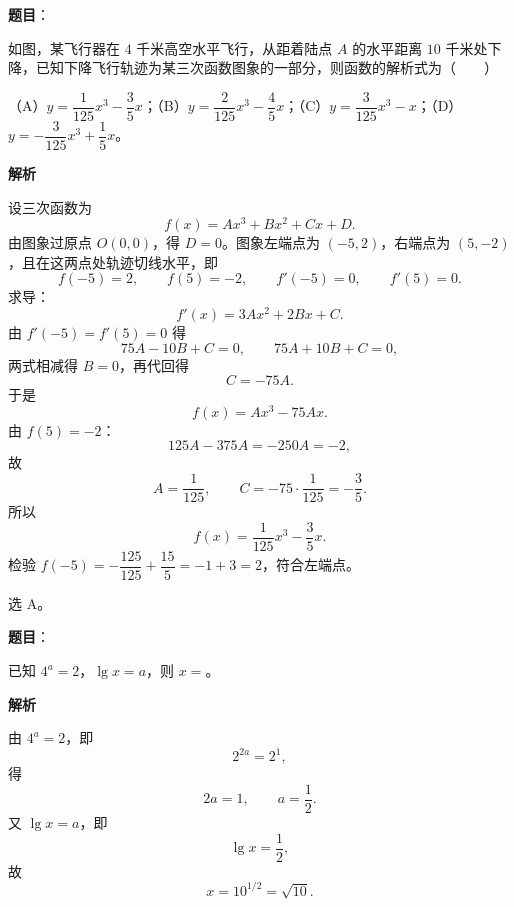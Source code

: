 \begin{answer}

\textbf{题目}：

如图，某飞行器在 $4$ 千米高空水平飞行，从距着陆点 $A$ 的水平距离 $10$ 千米处下降，已知下降飞行轨迹为某三次函数图象的一部分，则函数的解析式为\mbox{（　　）}
\nopagebreak[4]
\begin{center}\end{center}
\nopagebreak[4]
（A）$y=\dfrac{1}{125}x^3-\dfrac35x$；（B）$y=\dfrac{2}{125}x^3-\dfrac45x$；（C）$y=\dfrac{3}{125}x^3-x$；（D）$y=-\dfrac{3}{125}x^3+\dfrac15x$。

\textbf{解析}

设三次函数为
\nopagebreak[4]
\[f(x)=Ax^3+Bx^2+Cx+D.\]
由图象过原点 $O(0,0)$，得 $D=0$。图象左端点为 $(-5,2)$，右端点为 $(5,-2)$，且在这两点处轨迹切线水平，即
\nopagebreak[4]
\[f(-5)=2,\qquad f(5)=-2,\qquad f'(-5)=0,\qquad f'(5)=0.\]
求导：
\nopagebreak[4]
\[f'(x)=3Ax^2+2Bx+C.\]
由 $f'(-5)=f'(5)=0$ 得
\nopagebreak[4]
\[75A-10B+C=0,\qquad 75A+10B+C=0,\]
两式相减得 $B=0$，再代回得
\nopagebreak[4]
\[C=-75A.\]
于是
\nopagebreak[4]
\[f(x)=Ax^3-75Ax.\]
由 $f(5)=-2$：
\nopagebreak[4]
\[125A-375A=-250A=-2,\]
故
\nopagebreak[4]
\[A=\frac1{125},\qquad C=-75\cdot\frac1{125}=-\frac35.\]
所以
\nopagebreak[4]
\[f(x)=\frac1{125}x^3-\frac35x.\]
检验 $f(-5)=-\dfrac{125}{125}+\dfrac{15}{5}=-1+3=2$，符合左端点。

选 A。


\end{answer}
\begin{answer}

\textbf{题目}：

已知 $4^a=2$，$\lg x=a$，则 $x=$\gkblank{}。

\textbf{解析}

由 $4^a=2$，即
\nopagebreak[4]
\[2^{2a}=2^1,\]
得
\nopagebreak[4]
\[2a=1,\qquad a=\frac12.\]
又 $\lg x=a$，即
\nopagebreak[4]
\[\lg x=\frac12,\]
故
\nopagebreak[4]
\[x=10^{1/2}=\sqrt{10}.\]


\end{answer}
